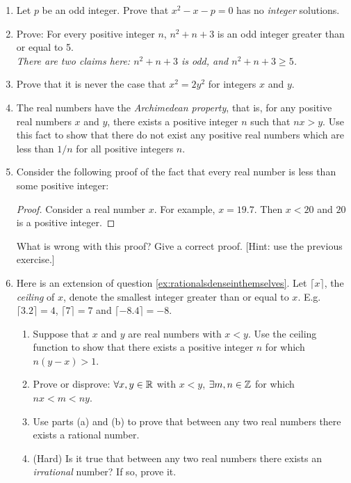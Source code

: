 \begin{exercises}{}{}
\begin{enumerate}
	\item Let $p$ be an odd integer. Prove that $x^2-x-p=0$ has no \emph{integer} solutions.
   
	\item Prove: For every positive integer $n$, $n^2+n+3$ is an odd integer greater than or equal to 5.\\
	\emph{There are two claims here: $n^2+n+3$ is odd, and $n^2+n+3\ge 5$.}
	  

    \item Prove that it is never the case that $x^2 = 2y^2$ for integers $x$ and $y$.
  

	
		\item The real numbers have the \emph{Archimedean property}, that is, for any positive real numbers $x$ and $y$, there exists a positive integer $n$ such that $nx > y$. Use this fact to show that there do not exist any positive real numbers which are less than $1/n$ for all positive integers $n$. 
  
    \item Consider the following proof of the fact that every real number is less than some positive integer:
  \begin{proof}
      Consider a real number $x$. For example, $x = 19.7$. Then $x < 20$ and $20$ is a positive integer. 
  \end{proof}
  What is wrong with this proof? Give a correct proof. [Hint: use the previous exercise.]
	
	\item Here is an extension of question \ref{ex:rationalsdenseinthemselves}. Let $\lceil x\rceil$, the \emph{ceiling} of $x$, denote the smallest integer greater than or equal to $x$. E.g.\ $\lceil 3.2\rceil=4$, $\lceil 7\rceil=7$ and $\lceil -8.4\rceil=-8$.
	\begin{enumerate}
  	\item Suppose that $x$ and $y$ are real numbers with $x<y$. Use the ceiling function to show that there exists a positive integer $n$ for which $n(y-x)>1$.
  	\item Prove or disprove: $\forall x,y\in\mathbb{R}$ with $x<y$, $\exists m,n\in\mathbb{Z}$ for which $nx<m<ny$.
  	\item Use parts (a) and (b) to prove that between any two real numbers there exists a rational number.
  	\item (Hard) Is it true that between any two real numbers there exists an \emph{irrational} number? If so, prove it.
	\end{enumerate}
	

\end{enumerate}
\end{exercises}
